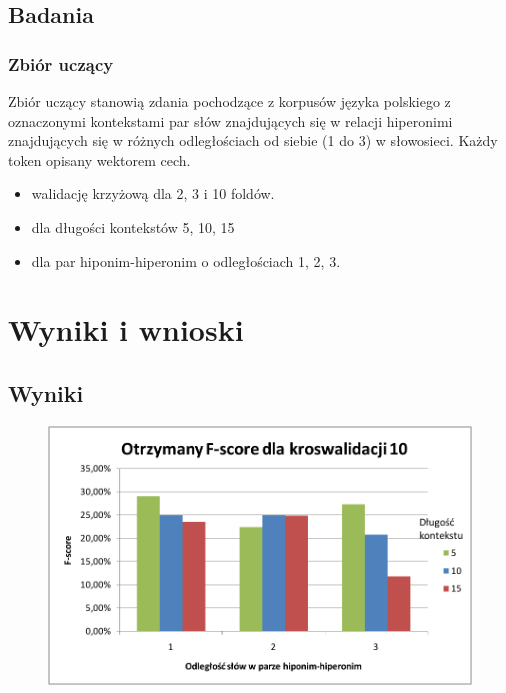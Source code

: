 \documentclass[a4paper,10pt]{report}
\begin{document}
\section{Badania}

\subsection{Zbiór uczący}

Zbiór uczący stanowią zdania pochodzące z korpusów języka polskiego z oznaczonymi kontekstami par słów znajdujących się w relacji hiperonimi znajdujących się w różnych odległościach od siebie (1 do 3) w słowosieci. Każdy token opisany wektorem cech.

\begin{itemize}
 \item walidację krzyżową dla 2, 3 i 10 foldów.
 \item dla długości kontekstów 5, 10, 15
 \item dla par hiponim-hiperonim o odległościach 1, 2, 3.
\end{itemize}

\chapter{Wyniki i wnioski}

\section{Wyniki}

\begin{figure}[h]
\centering
 \includegraphics[width=13cm]{img/image003.png}
 \caption{}
\label{fig:wykres}
\end{figure} 
\end{document}
